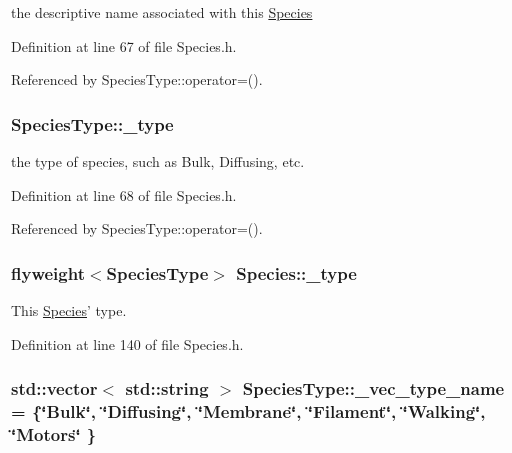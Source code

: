 the descriptive name associated with this \hyperlink{classSpecies}{Species} 



Definition at line 67 of file Species.\-h.



Referenced by Species\-Type\-::operator=().

\hypertarget{group__Chemistry_ga5acc1777425b096830e64a4e5080afbc}{
\subsubsection[{\-\_\-type}]{ {\bf Species\-Type\-::\-\_\-type}}}\label{group__Chemistry_ga5acc1777425b096830e64a4e5080afbc}


the type of species, such as Bulk, Diffusing, etc. 



Definition at line 68 of file Species.\-h.



Referenced by Species\-Type\-::operator=().

\hypertarget{group__Chemistry_ga77c5f76a330d0ef11a438b87877b910e}{
\subsubsection[{\-\_\-type}]{\setlength{\rightskip}{0pt plus 5cm}flyweight$<${\bf Species\-Type}$>$ {\bf Species\-::\-\_\-type}}}\label{group__Chemistry_ga77c5f76a330d0ef11a438b87877b910e}


This \hyperlink{classSpecies}{Species}' type. 



Definition at line 140 of file Species.\-h.

\hypertarget{group__Chemistry_ga8a4ff9d2899dab92d059bd59b9b5bf13}{
\subsubsection[{\-\_\-vec\-\_\-type\-\_\-name}]{\setlength{\rightskip}{0pt plus 5cm}std\-::vector$<$ std\-::string $>$ {\bf Species\-Type\-::\-\_\-vec\-\_\-type\-\_\-name} = \{\char`\"{}Bulk\char`\"{}, \char`\"{}{\bf Diffusing}\char`\"{}, \char`\"{}{\bf Membrane}\char`\"{}, \char`\"{}{\bf Filament}\char`\"{}, \char`\"{}{\bf Walking}\char`\"{}, \char`\"{}{\bf Motors}\char`\"{} \}}}\label{group__Chemistry_ga8a4ff9d2899dab92d059bd59b9b5bf13}


